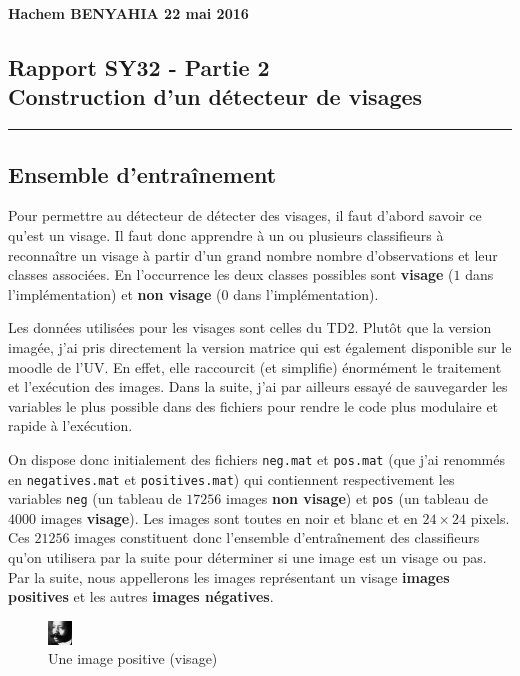 \documentclass[11pt]{report}
\begin{document}
\noindent
\textbf{Hachem BENYAHIA \hfill 22 mai 2016}

\begin{center}
\section*{Rapport SY32 - Partie 2 ~\\ Construction d'un détecteur de visages}
\rule{\textwidth}{2pt}
\end{center}

\subsection*{Ensemble d'entraînement}

Pour permettre au détecteur de détecter des visages, il faut d'abord savoir ce qu'est un visage. Il faut donc apprendre à un ou plusieurs classifieurs à reconnaître un visage à partir d'un grand nombre nombre d'observations et leur classes associées. En l'occurrence les deux classes possibles sont \textbf{visage} ($1$ dans l'implémentation) et \textbf{non visage} ($0$ dans l'implémentation).

Les données utilisées pour les visages sont celles du TD2. Plutôt que la version imagée, j'ai pris directement la version matrice qui est également disponible sur le moodle de l'UV. En effet, elle raccourcit (et simplifie) énormément le traitement et l'exécution des images. Dans la suite, j'ai par ailleurs essayé de sauvegarder les variables le plus possible dans des fichiers pour rendre le code plus modulaire et rapide à l'exécution.

On dispose donc initialement des fichiers \verb|neg.mat| et \verb|pos.mat| (que j'ai renommés en \verb|negatives.mat| et \verb|positives.mat|) qui contiennent respectivement les variables \verb|neg| (un tableau de $17256$ images \textbf{non visage}) et \verb|pos| (un tableau de $4000$ images \textbf{visage}). Les images sont toutes en noir et blanc et en $24 \times 24$ pixels. Ces $21256$ images constituent donc l'ensemble d'entraînement des classifieurs qu'on utilisera par la suite pour déterminer si une image est un visage ou pas. Par la suite, nous appellerons les images représentant un visage \textbf{images positives} et les autres \textbf{images négatives}.

\begin{figure}[h]
\centering
\includegraphics{image/pos.png}
\cprotect\caption{Une image positive (visage)}
\end{figure}
\end{document}
